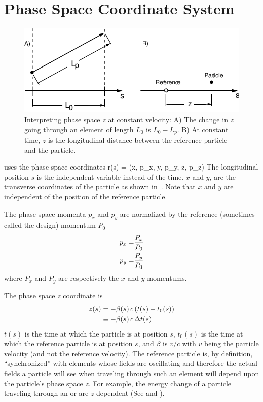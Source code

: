 \section{Phase Space Coordinate System}
\label{s:phase.space}

\begin{figure}
\centering 
\includegraphics{canonical-z.pdf} 
\caption[Interpreting phase space $z$ at constant velocity.]
{Interpreting phase space $z$ at constant velocity: A) The change in $z$
going through an element of length $L_0$ is $L_0 - L_p$.  B) At
constant time, $z$ is the longitudinal distance between the reference
particle and the particle.}
\label{f:canonical.z}
\end{figure}

\bmad uses the phase space coordinates 
\Begineq
  \Bf r(s) = (x, p_x, y, p_y, z, p_z)
\Endeq
The longitudinal position $s$ is the independent variable instead of
the time. $x$ and $y$, are the transverse coordinates of the particle
as shown in~. Note that $x$ and $y$ are independent
of the position of the reference particle.

The phase space momenta $p_x$ and $p_y$ are normalized by the
reference (sometimes called the design) momentum $P_0$
\begin{align}
  p_x = &\frac{P_x}{P_0} \nonumber \\
  p_y = &\frac{P_y}{P_0}
  \label{ppp}
\end{align}
where $P_x$ and $P_y$ are respectively the $x$ and $y$ momentums.


The phase space $z$ coordinate is 
\begin{align}
  z(s) &= -\beta(s) \, c \, (t(s) - t_0(s)) \nonumber \\
    &\equiv - \beta(s) \, c \, \Delta t(s)
  \label{zbctt}
\end{align}
$t(s)$ is the time at which the particle is at position $s$, $t_0(s)$
is the time at which the reference particle is at position $s$, and
$\beta$ is $v/c$ with $v$ being the particle velocity (and not the
reference velocity). The reference particle is, by definition,
``synchronized'' with elements whose fields are oscillating and therefore the
actual fields a particle will see when traveling through such an
element will depend upon the particle's phase space $z$. For example,
the energy change of a particle traveling through an  or
 are $z$ dependent (See  and ).


